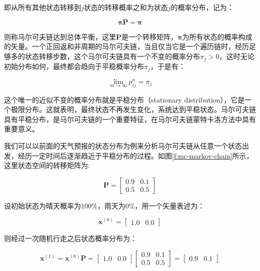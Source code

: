 \noindent 即从所有其他状态转移到$j$状态的转移概率之和为状态$j$的概率分布，记为：

\begin{equation}
	\mathbf{\pi} \mathbf{P}=\mathbf{\pi}
\end{equation}

\noindent 则称马尔可夫链达到总体平衡，这里$\mathbf{P}$是一个转移矩阵，$\mathbf{\pi}$为所有状态的概率构成的矢量。一个正回返和非周期的马尔可夫链，当且仅当它是一个遍历链时，经历足够多的状态转移步数，这个马尔可夫链具有一个不变的概率分布$\pi_j>0$，这时无论初始分布如何，最终都会趋向于平稳概率分布$\pi_j$，于是有：

\begin{equation}
	\lim_{m\rightarrow \infty}p^{n}_{ij}=\pi_j
\end{equation}

这个唯一的近似不变的概率分布就是平稳分布（stationary distribution），它是一个极限分布。这就表明，最终状态不再发生变化，系统达到平稳状态。马尔可夫链具有平稳分布，是马尔可夫链的一个重要特征，在马尔可夫链蒙特卡洛方法中具有重要意义。

我们可以以前面的天气预报的状态分布为例来分析马尔可夫链从任意一个状态出发，经历一定时间后逐渐趋近于平稳分布的过程。如图\ref{f:mc-markov-chain}所示，这里状态空间的转移矩阵为:

\begin{equation}
	\mathbf{P}=\begin{bmatrix}
		0.9 & 0.1\\0.5 & 0.5
	\end{bmatrix}
\end{equation}

\noindent 设初始状态为晴天概率为$100\%$，雨天为$0\%$，用一个矢量表述为：

\begin{equation}
	\mathbf{x}^{(0)}=\begin{bmatrix}
		1.0&0.0
	\end{bmatrix}
\end{equation}

\noindent 则经过一次随机行走之后状态概率分布为：

\begin{equation}
	\mathbf{x}^{(1)}=\mathbf{x}^{(0)}\mathbf{P}=\begin{bmatrix}
		1.0&0.0 
	\end{bmatrix}\begin{bmatrix}
		0.9&0.1\\0.5&0.5
	\end{bmatrix}=\begin{bmatrix}
		0.9&0.1
	\end{bmatrix}
\end{equation}

